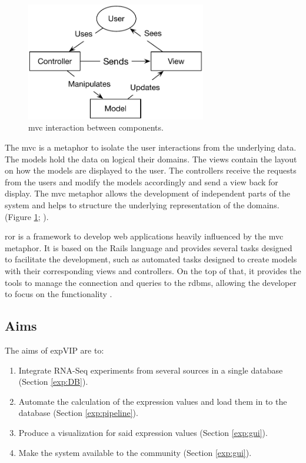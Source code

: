 \begin{figure} 
  \centering
  \includegraphics[width=0.7\textwidth]{LitReview/Figures/MVC.pdf}
  \caption{\acrshort{mvc} interaction between components.}
  \label{fig:poly:mvc}
\end{figure}
The \gls{mvc} is a metaphor to isolate the user interactions from the underlying data. 
The models hold the data on logical their domains.
The views contain the layout on how the models are displayed to the user.
The controllers receive the requests from the users and modify the models accordingly and send a view back for display. 
The \acrshort{mvc} metaphor allows the development of independent parts of the system and helps to structure the underlying representation of the domains.  (Figure \ref{fig:poly:mvc}; \citealt{Krasner1988}).

\gls{ror} is a framework to develop web applications heavily influenced by the \acrshort{mvc} metaphor. 
It is based on the Rails language and provides several tasks designed to facilitate the development, such as automated tasks designed to create models with their corresponding views and controllers. 
On the top of that, it provides the tools to manage the connection and queries to the \acrshort{rdbms}, allowing the developer to focus on the functionality \citep{RailsGuide2016}. 

\subsection{Aims}

The aims of expVIP are to:
\begin{enumerate}
\item Integrate RNA-Seq experiments from several sources in a single database (Section \ref{exp:DB}). 
\item Automate the calculation of the expression values and load them in to the database (Section \ref{exp:pipeline}).
\item Produce a visualization for said expression values (Section \ref{exp:gui}).
\item Make the system available to the community (Section \ref{exp:gui}).
\end{enumerate}


